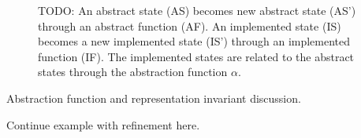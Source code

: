\begin{figure}
\caption{TODO: An abstract state (AS) becomes new abstract state (AS') through an abstract function (AF).  An implemented state (IS) becomes a new implemented state (IS') through an implemented function (IF).  The implemented states are related to the abstract states through the abstraction function $\alpha$.}
\end{figure}

Abstraction function and representation invariant discussion.

Continue example with refinement here.